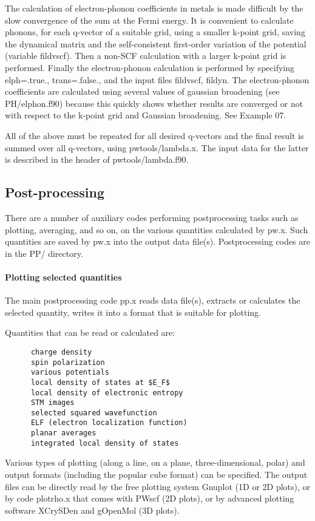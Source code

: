 \documentclass[12pt,a4paper]{article}
\begin{document}
The calculation of electron-phonon coefficients in metals is made difficult by
the slow convergence of the sum at the Fermi energy. It is convenient to 
calculate phonons, for each q-vector of a suitable grid, using a
smaller k-point 
grid, saving the dynamical matrix and the self-consistent first-order variation
of the potential (variable fildvscf). Then a non-SCF calculation with
a larger k-point grid is performed. Finally the electron-phonon calculation is
performed by specifying elph=.true., trans=.false., and the input files
fildvscf, fildyn. The electron-phonon coefficients are calculated using several
values of gaussian broadening (see PH/elphon.f90) because this quickly
shows whether results are converged or not with respect to the k-point grid
and Gaussian broadening. See Example 07.

All of the above must be repeated for all desired q-vectors and the final
result is summed over all q-vectors, using pwtools/lambda.x. The input
data for the latter is described in the header of pwtools/lambda.f90.

\subsection{Post-processing}

There are a number of auxiliary codes performing postprocessing tasks such
as plotting, averaging, and so on, on the various quantities calculated by
pw.x. Such quantities are saved by pw.x into the output data file(s). 
Postprocessing codes are in the PP/ directory.

\paragraph{Plotting selected quantities}
  
The main postprocessing code pp.x reads data file(s), extracts or calculates 
the selected quantity, writes it into a format that is suitable for plotting.

Quantities that can be read or calculated are:
\begin{verbatim}
      charge density
      spin polarization
      various potentials
      local density of states at $E_F$
      local density of electronic entropy
      STM images
      selected squared wavefunction
      ELF (electron localization function)
      planar averages
      integrated local density of states
\end{verbatim}
Various types of plotting (along a line, on a plane, three-dimensional, polar)
and output formats (including the popular cube format) can be specified.
The output files can be directly read by the free plotting system Gnuplot
(1D or 2D plots), or by code plotrho.x that comes with PWscf (2D plots),
or by advanced plotting software XCrySDen and gOpenMol (3D plots).
\end{document}
